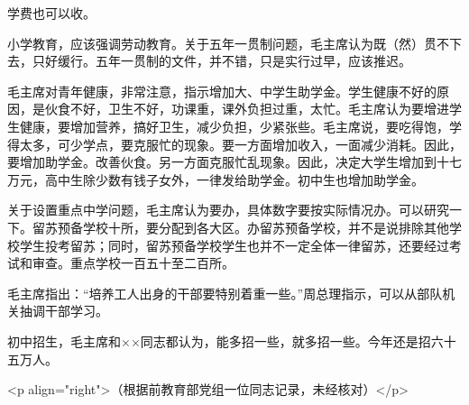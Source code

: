 学费也可以收。

小学教育，应该强调劳动教育。关于五年一贯制问题，毛主席认为既（然）贯不下去，只好缓行。五年一贯制的文件，并不错，只是实行过早，应该推迟。

毛主席对青年健康，非常注意，指示增加大、中学生助学金。学生健康不好的原因，是伙食不好，卫生不好，功课重，课外负担过重，太忙。毛主席认为要增进学生健康，要增加营养，搞好卫生，减少负担，少紧张些。毛主席说，要吃得饱，学得太多，可少学点，要克服忙的现象。要一方面增加收入，一面减少消耗。因此，要增加助学金。改善伙食。另一方面克服忙乱现象。因此，决定大学生增加到十七万元，高中生除少数有钱子女外，一律发给助学金。初中生也增加助学金。

关于设置重点中学问题，毛主席认为要办，具体数字要按实际情况办。可以研究一下。留苏预备学校十所，要分配到各大区。办留苏预备学校，并不是说排除其他学校学生投考留苏；同时，留苏预备学校学生也并不一定全体一律留苏，还要经过考试和审查。重点学校一百五十至二百所。

毛主席指出：“培养工人出身的干部要特别着重一些。”周总理指示，可以从部队机关抽调干部学习。

初中招生，毛主席和××同志都认为，能多招一些，就多招一些。今年还是招六十五万人。

<p align="right">（根据前教育部党组一位同志记录，未经核对）</p>


